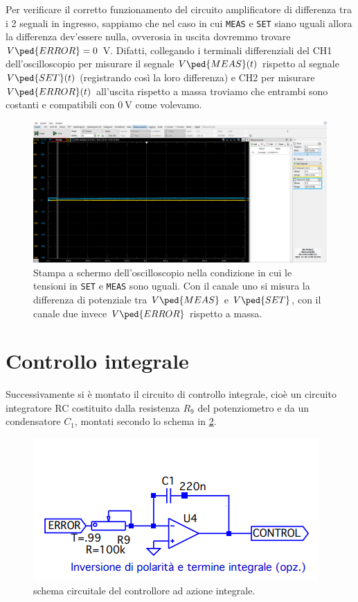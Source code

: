 \documentclass[10pt, a4paper, italian]{article}
\begin{document}
Per verificare il corretto funzionamento del circuito amplificatore di
differenza tra i 2 segnali in ingresso, sappiamo che nel caso in cui
\verb+MEAS+ e \verb+SET+ siano uguali allora la differenza dev'essere nulla,
ovverosia in uscita dovremmo trovare $V\ped{ERROR} = 0$ V.
Difatti, collegando i terminali differenziali del CH1 dell'oscilloscopio
per misurare il segnale $V\ped{MEAS} (t)$ rispetto al segnale $V\ped{SET} (t)$
(registrando così la loro differenza) e CH2 per misurare $V\ped{ERROR} (t)$
all'uscita rispetto a massa troviamo che entrambi sono costanti e compatibili
con $\SI{0}{\V}$ come volevamo.
\begin{figure}[htbp]
    \centering
	\includegraphics[width=\textwidth]{meas.same.set}
    \caption{Stampa a schermo dell'oscilloscopio nella condizione in cui le
    tensioni in \texttt{SET} e \texttt{MEAS} sono uguali. Con il canale uno
    si misura la differenza di potenziale tra $V\ped{MEAS}$ e $V\ped{SET}$,
    con il canale due invece $V\ped{ERROR}$ rispetto a massa.
    \label{fig: meas=set}}
\end{figure}

\section{Controllo integrale}
Successivamente si è montato il circuito di controllo integrale, cioè un
circuito integratore RC costituito dalla resistenza $R_9$ del potenziometro e
da un condensatore $C_1$, montati secondo lo schema in \cref{fig: ctrlint}.
\begin{figure}[htbp]
    \centering
	\includegraphics[scale=0.6]{controlgenint}
    \caption{schema circuitale del controllore ad azione integrale.
    \label{fig: ctrlint}}
\end{figure}
\end{document}
